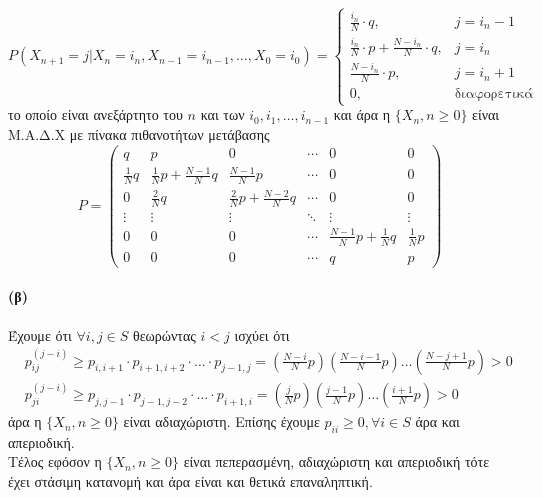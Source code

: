 \documentclass[a4paper,11pt]{article}
\begin{document}
\[
	P(X_{n+1} = j|X_n = i_n, X_{n-1} = i_{n-1}, \dots , X_0 = i_0) =
		\begin{cases}
			\frac{i_n}{N} \cdot q, & j = i_n-1\\
			\frac{i_n}{N} \cdot p + \frac{N-i_n}{N} \cdot q, & j = i_n\\
			\frac{N-i_n}{N} \cdot p, & j = i_n+1\\
			0, & \text{διαφορετικά}
		\end{cases}
\]
το οποίο είναι ανεξάρτητο του $n$ και των $i_0,i_1,\dots , i_{n-1}$ και άρα η $\{X_n, n \geq 0\}$ είναι Μ.Α.Δ.Χ με πίνακα πιθανοτήτων μετάβασης
\[
	P =
		\begin{pmatrix}
			q & p & 0 & \cdots & 0 & 0\\[1em]
			\frac{1}{N} q & \frac{1}{N}p + \frac{N-1}{N}q & \frac{N-1}{N} p & \cdots & 0 & 0\\[1em]
			0 & \frac{2}{N} q & \frac{2}{N}p + \frac{N-2}{N}q & \cdots & 0 & 0\\[1em]
			\vdots & \vdots & \vdots & \ddots & \vdots & \vdots\\[1em]
			0 & 0 & 0 & \cdots & \frac{N-1}{N}p + \frac{1}{N}q & \frac{1}{N} p\\[1em]
			0 & 0 & 0 & \cdots & q & p
		\end{pmatrix}
\]

\paragraph{(β)}
Έχουμε ότι $\forall i,j \in S$ θεωρώντας $i < j$ ισχύει ότι
\begin{align*}
	&p_{ij}^{(j-i)} \geq p_{i,i+1} \cdot p_{i+1,i+2} \cdot \dots \cdot p_{j-1,j} = \left(\frac{N-i}{N}p\right) \left(\frac{N-i-1}{N}p\right) \dots \left(\frac{N-j+1}{N}p\right) > 0\\
	&p_{ji}^{(j-i)} \geq p_{j,j-1} \cdot p_{j-1,j-2} \cdot \dots \cdot p_{i+1,i} = \left(\frac{j}{N}p\right) \left(\frac{j-1}{N}p\right) \dots \left(\frac{i+1}{N}p\right) > 0
\end{align*}
άρα η $\{X_n,n\geq 0\}$ είναι αδιαχώριστη.
Επίσης έχουμε $p_{ii} \geq 0, \forall i \in S$ άρα και απεριοδική.
\\[8pt]
Τέλος εφόσον η $\{X_n,n\geq 0\}$ είναι πεπερασμένη, αδιαχώριστη και απεριοδική τότε έχει στάσιμη κατανομή και άρα είναι και θετικά επαναληπτική.
\end{document}
